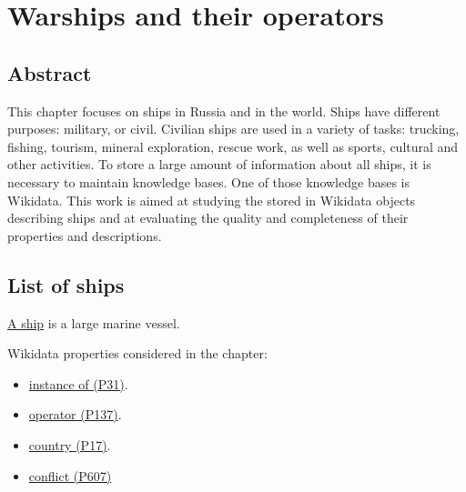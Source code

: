 \setchapterpreamble[u]{\margintoc}
\chapter{Warships and their operators\protect\footnotemark}


\section{Abstract}

This chapter focuses on ships in Russia and in the world. Ships have different purposes: military, or civil. Civilian ships are used in a variety of tasks: trucking, fishing, tourism, mineral exploration, rescue work, as well as sports, cultural and other activities. To store a large amount of information about all ships, it is necessary to maintain knowledge bases. One of those knowledge bases is Wikidata. This work is aimed at studying the stored in Wikidata objects describing ships and at evaluating the quality and completeness of their properties and descriptions.


\section{List of ships}

\href{https://en.wikipedia.org/wiki/Ship}{A ship} is a large marine vessel.


\label{question:ship_1}

Wikidata properties considered in the chapter: 
\begin{itemize}
  \item \href{https://www.wikidata.org/wiki/Property:P31}{instance of (P31)}.
  \item \href{https://www.wikidata.org/wiki/Property:P137}{operator (P137)}.
  \item \href{https://www.wikidata.org/wiki/Property:P17}{country (P17)}.
  \item \href{https://www.wikidata.org/wiki/Property:P607}{conflict (P607)}
\end{itemize}


